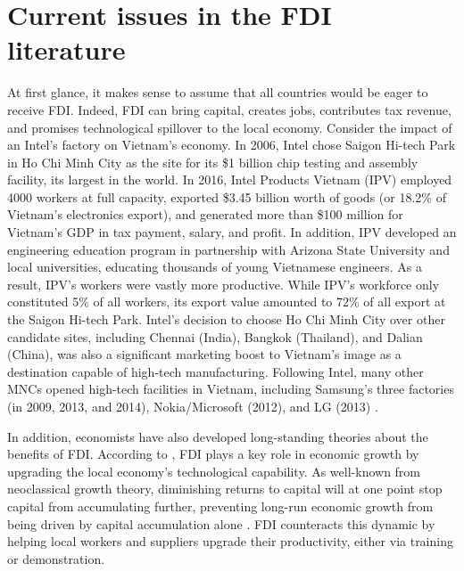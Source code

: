\chapter{Current issues in the FDI literature}
\label{chap:literature_issues}

At first glance, it makes sense to assume that all countries would be eager to
receive FDI. Indeed, FDI can bring capital, creates jobs, contributes tax
revenue, and promises technological spillover to the local economy. Consider the
impact of an Intel's factory on Vietnam's economy. In 2006, Intel chose Saigon
Hi-tech Park in Ho Chi Minh City as the site for its \$1 billion chip testing
and assembly facility, its largest in the world. In 2016, Intel Products Vietnam
(IPV) employed 4000 workers at full capacity, exported \$3.45 billion worth of
goods (or 18.2\% of Vietnam's electronics export), and generated more than \$100
million for Vietnam's GDP in tax payment, salary, and profit. In addition, IPV
developed an engineering education program in partnership with Arizona State
University and local universities, educating thousands of young Vietnamese
engineers. As a result, IPV's workers were vastly more productive. While IPV's
workforce only constituted 5\% of all workers, its export value amounted to 72\%
of all export at the Saigon Hi-tech Park. Intel's decision to choose Ho Chi Minh
City over other candidate sites, including Chennai (India), Bangkok (Thailand),
and Dalian (China), was also a significant marketing boost to Vietnam's image as
a destination capable of high-tech manufacturing. Following Intel, many other
MNCs opened high-tech facilities in Vietnam, including Samsung's three factories
(in 2009, 2013, and 2014), Nokia/Microsoft (2012), and LG (2013)
\citep{Dinh2016, UNCTAD2008}.

In addition, economists have also developed long-standing theories about the
benefits of FDI. According to \citet{Findlay1978}, FDI plays a key
role in economic growth by upgrading the local economy's technological
capability. As well-known from neoclassical growth theory, diminishing returns
to capital will at one point stop capital from accumulating further, preventing
long-run economic growth from being driven by capital accumulation alone
\citep{Solow1956}. FDI counteracts this dynamic by helping local workers and
suppliers upgrade their productivity, either via training or demonstration.

